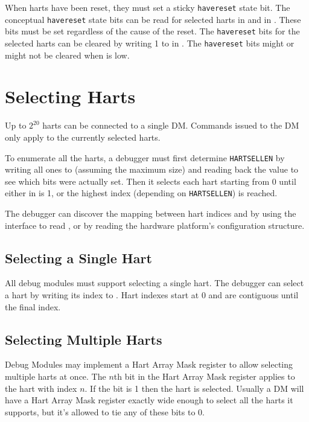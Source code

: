 When harts have been reset, they must set a sticky {\tt havereset} state bit.
The conceptual {\tt havereset} state bits can be read for selected harts in
\FdmDmstatusAnyhavereset and \FdmDmstatusAllhavereset in \RdmDmstatus.
These bits must be set regardless of the cause of the reset.
The {\tt havereset} bits for the selected harts
can be cleared by writing 1 to \FdmDmcontrolAckhavereset in \RdmDmcontrol.
The {\tt havereset} bits might or might not be cleared
when \FdmDmcontrolDmactive is low.

\section{Selecting Harts} \label{selectingharts}

Up to $2^{20}$ harts can be connected to a single DM. Commands issued to the DM
only apply to the currently selected harts.

To enumerate all the harts, a debugger must first determine {\tt HARTSELLEN}
by writing  all ones to \Fhartsel (assuming the maximum size) and reading back
the value to see which bits were actually set.  Then it selects each hart
starting from 0 until either \FdmDmstatusAnynonexistent in \RdmDmstatus is 1, or the
highest index (depending on {\tt HARTSELLEN}) is reached.

The debugger can discover the mapping between hart indices and
\Rmhartid by using the interface to read \Rmhartid, or by
reading the hardware platform's configuration structure.

\subsection {Selecting a Single Hart}

All debug modules must support selecting a single hart.
The debugger can select a hart by writing its index to \Fhartsel.
Hart indexes start at 0 and are contiguous until the final index.

\subsection {Selecting Multiple Harts} \label{hartarraymask}

Debug Modules may implement a Hart Array Mask register to allow selecting
multiple harts at once. The $n$th bit in the Hart Array Mask register applies to
the hart with index $n$. If the bit is 1 then the hart is selected.  Usually a DM
will have a Hart Array Mask register exactly wide enough to select all the
harts it supports, but it's allowed to tie any of these bits to 0.

